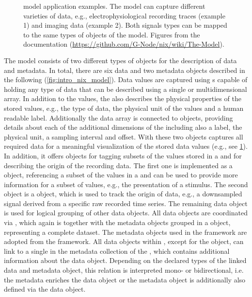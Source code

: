 \begin{figure}[hbt]
 \centering
 \scalebox{0.5}{
 }
 \caption[ model application examples]{ model application examples. The model can capture different varieties of data, e.g., electrophysiological recording traces (example 1) and imaging data (example 2). Both signals types can be mapped to the same types of objects of the  model. Figures from  the documentation (\url{https://github.com/G-Node/nix/wiki/The-Model}).}
 \label{fig:intro_nix_examples}
\end{figure}

The  model consists of two different types of objects for the description of data and metadata. In total, there are six data and two metadata objects  described in the following (\cref{fig:intro_nix_model}).
Data values are captured using s capable of holding any type of data that can be described using a single or multidimensional array. In addition to the values, the  also describes the physical properties of the stored values, e.g., the type of data, the physical unit of the values and a human readable label. Additionally the data array is connected to  objects, providing details about each of the additional dimensions of the  including also a label, the physical unit, a sampling interval and offset. With these two objects  captures all required data for a meaningful visualization of the stored data values (e.g., see \cref{fig:intro_nix_examples}). In addition, it offers objects for tagging subsets of the values stored in a  and for describing the origin of the recording data. The first one is implemented as a  object, referencing a subset of the values in a  and can be used to provide more information for a subset of values, e.g., the presentation of a stimulus. The second object is a  object, which is used to track the origin of data, e.g., a downsampled signal derived from a specific raw recorded time series. The remaining data object  is used for logical grouping of other  data objects. All data objects are coordinated via , which again is together with the metadata objects grouped in a   object, representing a complete dataset.
The metadata objects used in the  framework are adopted from the  framework. All data objects within , except for the  object, can link to a single  in the metadata collection of the  , which contains additional information about the data object. Depending on the declared types of the linked data and metadata object, this relation is interpreted mono- or bidirectional, i.e. the metadata  enriches the data object or the metadata object is additionally also defined via the data object.




